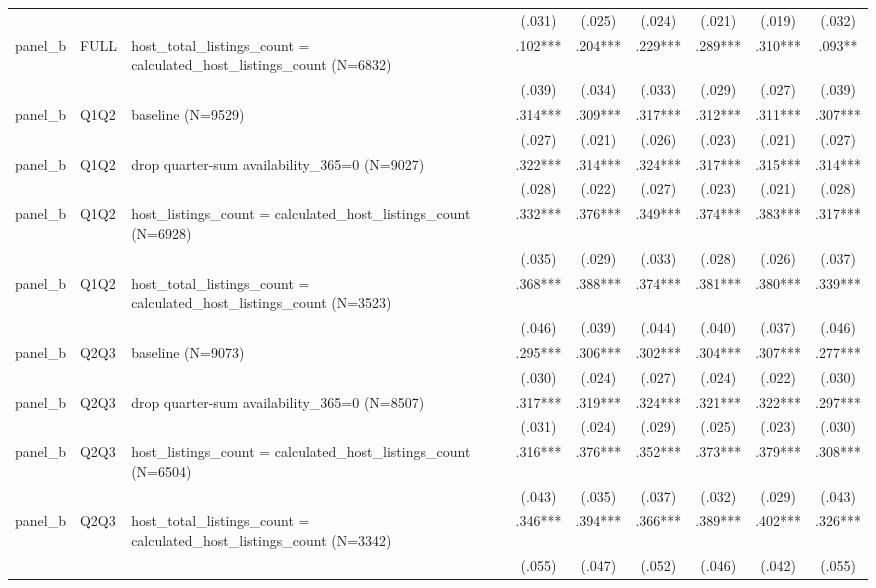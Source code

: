 \begin{tabular}{lllcccccc}
\\
 &  &  & (.031) & (.025) & (.024) & (.021) & (.019) & (.032)
\\
panel\_b & FULL & host\_total\_listings\_count = calculated\_host\_listings\_count (N=6832) & .102*** & .204*** & .229*** & .289*** & .310*** & .093**
\\
 &  &  & (.039) & (.034) & (.033) & (.029) & (.027) & (.039)
\\
panel\_b & Q1Q2 & baseline (N=9529) & .314*** & .309*** & .317*** & .312*** & .311*** & .307***
\\
 &  &  & (.027) & (.021) & (.026) & (.023) & (.021) & (.027)
\\
panel\_b & Q1Q2 & drop quarter-sum availability\_365=0 (N=9027) & .322*** & .314*** & .324*** & .317*** & .315*** & .314***
\\
 &  &  & (.028) & (.022) & (.027) & (.023) & (.021) & (.028)
\\
panel\_b & Q1Q2 & host\_listings\_count = calculated\_host\_listings\_count (N=6928) & .332*** & .376*** & .349*** & .374*** & .383*** & .317***
\\
 &  &  & (.035) & (.029) & (.033) & (.028) & (.026) & (.037)
\\
panel\_b & Q1Q2 & host\_total\_listings\_count = calculated\_host\_listings\_count (N=3523) & .368*** & .388*** & .374*** & .381*** & .380*** & .339***
\\
 &  &  & (.046) & (.039) & (.044) & (.040) & (.037) & (.046)
\\
panel\_b & Q2Q3 & baseline (N=9073) & .295*** & .306*** & .302*** & .304*** & .307*** & .277***
\\
 &  &  & (.030) & (.024) & (.027) & (.024) & (.022) & (.030)
\\
panel\_b & Q2Q3 & drop quarter-sum availability\_365=0 (N=8507) & .317*** & .319*** & .324*** & .321*** & .322*** & .297***
\\
 &  &  & (.031) & (.024) & (.029) & (.025) & (.023) & (.030)
\\
panel\_b & Q2Q3 & host\_listings\_count = calculated\_host\_listings\_count (N=6504) & .316*** & .376*** & .352*** & .373*** & .379*** & .308***
\\
 &  &  & (.043) & (.035) & (.037) & (.032) & (.029) & (.043)
\\
panel\_b & Q2Q3 & host\_total\_listings\_count = calculated\_host\_listings\_count (N=3342) & .346*** & .394*** & .366*** & .389*** & .402*** & .326***
\\
 &  &  & (.055) & (.047) & (.052) & (.046) & (.042) & (.055)

\end{tabular}
